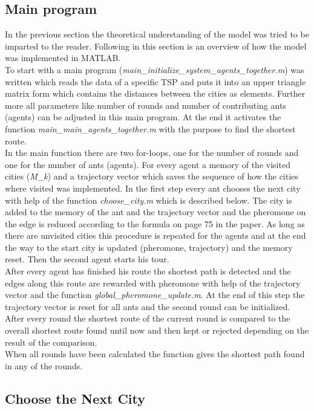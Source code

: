 \subsection{Main program}
In the previous section the theoretical understanding of the model was tried to be imparted to the reader. Following in this section is an overview of how the model was implemented in MATLAB. \\
To start with a main program (\textit{main\_initialize\_system\_agents\_together.m}) was written which reads the data of a specific TSP and puts it into an upper triangle matrix form which contains the distances between the cities as elements. Further more all parameters like number of rounds and number of contributing ants (agents) can be adjusted in this main program. At the end it activates the function \textit{main\_main\_agents\_together.m} with the purpose to find the shortest route. \\
In the main function there are two for-loops, one for the number of rounds and one for the number of ants (agents). For every agent a memory of the visited cities (\textit{M\_k}) and a trajectory vector which saves the sequence of how the cities where visited was implemented. In the first step every ant chooses the next city with help of the function \textit{choose\_city.m} which is described below. The city is added to the memory of the ant and the trajectory vector and the pheromone on the edge is reduced according to the formula on page 75 in the paper. As long as there are unvisited cities this procedure is repeated for the agents and at the end the way to the start city is updated (pheromone, trajectory) and the memory reset. Then the second agent starts his tour. \\
After every agent has finished his route the shortest path is detected and the edges along this route are rewarded with pheromone with help of the trajectory vector and the function \textit{global\_pheromone\_update.m}. At the end of this step the trajectory vector is reset for all ants and the second round can be initialized. After every round the shortest route of the current round is compared to the overall shortest route found until now and then kept or rejected depending on the result of the comparison. \\
When all rounds have been calculated the function gives the shortest path found in any of the rounds.

\subsection{Choose the Next City}

